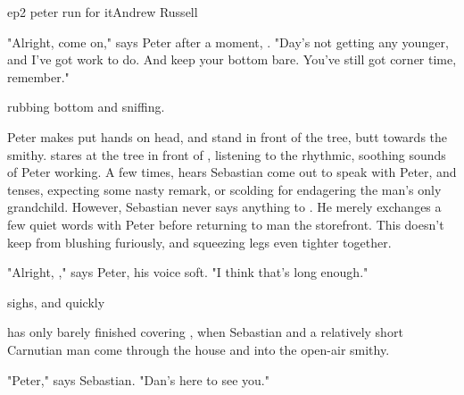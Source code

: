 \documentclass{book}
\begin{document}
\begin{childnode}{ep2 peter run for it}{Andrew Russell}

    "Alright, come on," says Peter after a moment, . "Day's not getting any younger, and I've got work to do. And keep your bottom bare. You've still got corner time,
    remember." 

     rubbing \hisher{} bottom and sniffing.

    Peter makes \name{} put \hisher{} hands on \hisher{} head, and stand in front of the tree, butt towards the smithy. \name{} stares at the tree in front of \himher{}, listening to the rhythmic, soothing sounds of Peter working. A few times, \heshe{} hears
    Sebastian come out to speak with Peter, and \name{} tenses, expecting some nasty remark, or scolding for endagering the man's only grandchild. However, Sebastian never says anything to \name{}. He merely exchanges a few quiet words with Peter before returning
    to man the storefront. This doesn't keep \name{} from blushing furiously, and squeezing \hisher{} legs even tighter together. 

    "Alright, \name{}," says Peter, his voice soft. "I think that's long enough."

    \name{} sighs, and quickly   

    \name{} has only barely finished covering \himselfherself{}, when Sebastian and a relatively short Carnutian man come through the house and into the open-air smithy.

    "Peter," says Sebastian. "Dan's here to see you."


            
\end{childnode}
\end{document}
